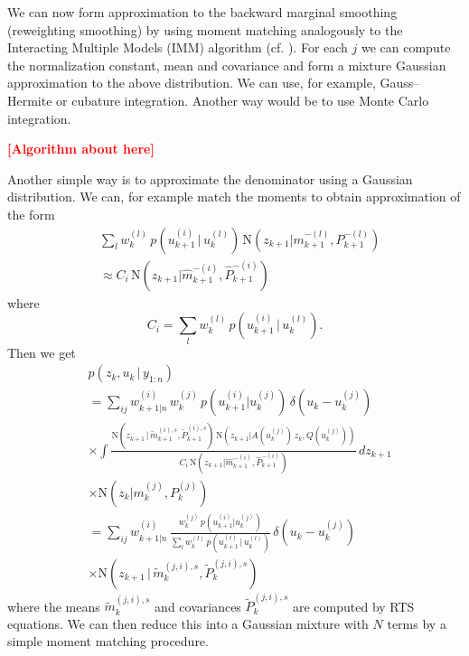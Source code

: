 \documentclass[twocolumn]{autart}    %
\newcommand{\comment}[1]{\textcolor{red}{\textbf{[#1]}}}
\begin{document}
%
We can now form approximation to the backward marginal smoothing
(reweighting smoothing) by using moment matching analogously to the
Interacting Multiple Models (IMM) algorithm
\cite{Bar-Shalom+Li+Kirubarajan:2001} (cf. \cite{Barber:2006}). For
each $j$ we can compute the normalization constant, mean and
covariance and form a mixture Gaussian approximation to the above
distribution. We can use, for example, Gauss--Hermite or cubature
integration. Another way would be to use Monte Carlo integration.

\comment{Algorithm about here}

Another simple way is to approximate the denominator using a Gaussian
distribution. We can, for example match the moments to obtain
approximation of the form
%
\begin{equation}
\begin{split}
  &\sum_l w_k^{(l)} \, p(u_{k+1}^{(i)}\,|\,u_k^{(l)}) \,
            \mathrm{N}(z_{k+1} | m^{-(l)}_{k+1}, P^{-(l)}_{k+1}) \\
  &\approx
  C_i \, \mathrm{N}(z_{k+1} | \hat{m}^{-(i)}_{k+1}, \hat{P}^{-(i)}_{k+1})
\end{split}
\end{equation}
%
where
%
\begin{equation}
  C_i = \sum_l w_k^{(l)} \, p(u_{k+1}^{(i)}\,|\,u_k^{(l)}).
\end{equation}
%
Then we get
%
\begin{equation}
\begin{split}
 &p(z_{k},u_{k} \,|\, y_{1:n}) \\
 &= \sum_{ij} w^{(i)}_{k+1|n} \, w_k^{(j)} \, 
      p(u_{k+1}^{(i)} | u_k^{(j)}) \, \delta(u_{k} - u_{k}^{(j)}) \\
 &\times \int 
    \frac{\mathrm{N}(z_{k+1}\,|\,\tilde{m}_{k+1}^{(i),s},\tilde{P}_{k+1}^{(i),s}) \,
          \mathrm{N}(z_{k+1} | A(u_k^{(j)}) \, z_k, Q(u_k^{(j)}))}
        {C_i \, \mathrm{N}(z_{k+1} | \hat{m}^{-(i)}_{k+1}, \hat{P}^{-(i)}_{k+1})} \, dz_{k+1} \\
 &\times \mathrm{N}(z_{k} | m^{(j)}_{k}, P^{(j)}_{k}) \\
 &= \sum_{ij} w^{(i)}_{k+1|n} \,
    \frac{w_k^{(j)} \, p(u_{k+1}^{(i)} | u_k^{(j)})}
         {\sum_l w_k^{(l)} \, p(u_{k+1}^{(i)}\,|\,u_k^{(l)})} \, \delta(u_{k} - u_{k}^{(j)}) \\
 &\times \mathrm{N}(z_{k+1}\,|\,\tilde{m}_{k}^{(j,i),s},\tilde{P}_{k}^{(j,i),s}) \,
\end{split}
\label{eq:simplerbrw}
\end{equation}
%
where the means $\tilde{m}_{k}^{(j,i),s}$ and covariances
$\tilde{P}_{k}^{(j,i),s}$ are computed by RTS equations. We can then
reduce this into a Gaussian mixture with $N$ terms by a simple moment
matching procedure.
\end{document}
